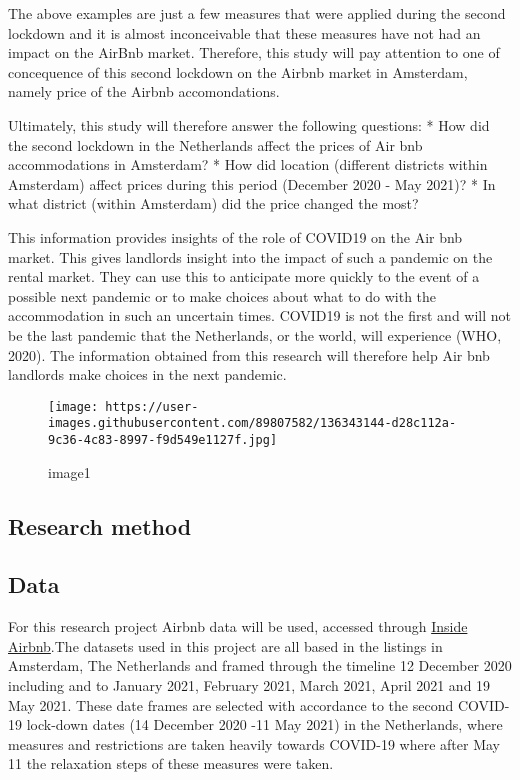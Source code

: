 \documentclass[
]{article}
\begin{document}
The above examples are just a few measures that were applied during the
second lockdown and it is almost inconceivable that these measures have
not had an impact on the AirBnb market. Therefore, this study will pay
attention to one of concequence of this second lockdown on the Airbnb
market in Amsterdam, namely price of the Airbnb accomondations.

Ultimately, this study will therefore answer the following questions: *
How did the second lockdown in the Netherlands affect the prices of Air
bnb accommodations in Amsterdam? * How did location (different districts
within Amsterdam) affect prices during this period (December 2020 - May
2021)? * In what district (within Amsterdam) did the price changed the
most?

This information provides insights of the role of COVID19 on the Air bnb
market. This gives landlords insight into the impact of such a pandemic
on the rental market. They can use this to anticipate more quickly to
the event of a possible next pandemic or to make choices about what to
do with the accommodation in such an uncertain times. COVID19 is not the
first and will not be the last pandemic that the Netherlands, or the
world, will experience (WHO, 2020). The information obtained from this
research will therefore help Air bnb landlords make choices in the next
pandemic.

\begin{figure}
\centering
\texttt{[image: https://user-images.githubusercontent.com/89807582/136343144-d28c112a-9c36-4c83-8997-f9d549e1127f.jpg]}
\caption{image1}
\end{figure}

\hypertarget{research-method}{%
\subsection{Research method}\label{research-method}}

\hypertarget{data}{%
\subsection{Data}\label{data}}

For this research project Airbnb data will be used, accessed through
\href{http://insideairbnb.com/get-the-data.html}{Inside Airbnb}.The
datasets used in this project are all based in the listings in
Amsterdam, The Netherlands and framed through the timeline 12 December
2020 including and to January 2021, February 2021, March 2021, April
2021 and 19 May 2021. These date frames are selected with accordance to
the second COVID-19 lock-down dates (14 December 2020 -11 May 2021) in
the Netherlands, where measures and restrictions are taken heavily
towards COVID-19 where after May 11 the relaxation steps of these
measures were taken.
\end{document}
